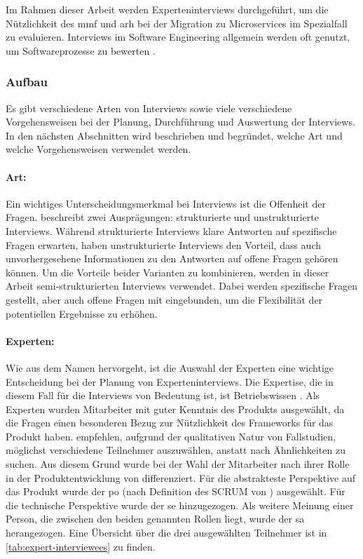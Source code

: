 Im Rahmen dieser Arbeit werden Experteninterviews durchgeführt, um die Nützlichkeit des \gls{mmf} und \gls{arh} bei der Migration zu Microservices im Spezialfall \jf zu evaluieren.
Interviews im Software Engineering allgemein werden oft genutzt, um Softwareprozesse zu bewerten \cite{seaman2008qualitative}.

\subsubsection{Aufbau}
Es gibt verschiedene Arten von Interviews sowie viele verschiedene Vorgehensweisen bei der Planung, Durchführung und Auswertung der Interviews.
In den nächsten Abschnitten wird beschrieben und begründet, welche Art und welche Vorgehensweisen verwendet werden.

\paragraph{Art:} Ein wichtiges Unterscheidungsmerkmal bei Interviews ist die Offenheit der Fragen.
 beschreibt zwei Ausprägungen: strukturierte und unstrukturierte Interviews.
Während struk\-tu\-rier\-te Interviews klare Antworten auf spezifische Fragen erwarten, haben unstrukturierte Interviews den Vorteil, dass auch unvorhergesehene Informationen zu den Antworten auf offene Fragen gehören können.
Um die Vorteile beider Varianten zu kombinieren, werden in dieser Arbeit semi-strukturierten Interviews \cite{seaman2008qualitative} verwendet.
Dabei werden spezifische Fragen gestellt, aber auch offene Fragen mit eingebunden, um die Flexibilität der potentiellen Ergebnisse zu erhöhen.

\paragraph{Experten:} Wie aus dem Namen hervorgeht, ist die Auswahl der Experten eine wichtige Entscheidung bei der Planung von Experteninterviews.
Die Expertise, die in diesem Fall für die Interviews von Bedeutung ist, ist \glqq Betriebswissen\grqq{} \cite{Meuser2009}.
Als Experten wurden Mitarbeiter mit guter Kenntnis des Produkts \jf ausgewählt, da die Fragen einen besonderen Bezug zur Nützlichkeit des Frameworks für das Produkt haben.
 empfehlen, aufgrund der qualitativen Natur von Fallstudien, möglichst verschiedene Teilnehmer auszuwählen, anstatt nach Ähnlichkeiten zu suchen.
Aus diesem Grund wurde bei der Wahl der Mitarbeiter nach ihrer Rolle in der Produktentwicklung von \jf differenziert.
Für die abstrakteste Perspektive auf das Produkt wurde der \acrlong{po} (nach Definition des SCRUM von ) ausgewählt.
Für die technische Perspektive wurde der \gls{se} hinzugezogen.
Als weitere Meinung einer Person, die zwischen den beiden genannten Rollen liegt, wurde der \gls{sa} herangezogen. 
Eine Übersicht über die drei ausgewählten Teilnehmer ist in \cref{tab:expert-interviewees} zu finden.


